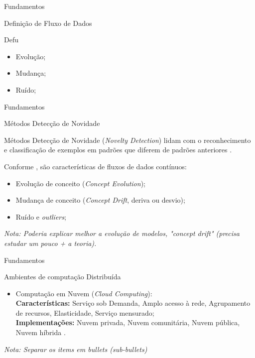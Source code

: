 \documentclass[aspectratio=43,10pt]{beamer}
\newcommand{\nota}[1]{\hspace*{-0.5cm}\textit{{\color[rgb]{1,0,0}Nota: #1}}}
\begin{document}
\begin{frame}[fragile]{Fundamentos}


\begin{block}{Definição de Fluxo de Dados}
  
  \vspace{5mm}
  Defu

  \begin{itemize}
    \item Evolução;
    \item Mudança;
    \item Ruído;
  \end{itemize}
\end{block}
\end{frame}

\newcommand{\novelty}{\emph{Novelty Detection}\xspace}
\newcommand{\nd}{ND\xspace}
\newcommand{\drift}{\emph{Concept Drift}\xspace}
\newcommand{\evolution}{\emph{Concept Evolution}\xspace}

\begin{frame}[fragile]{Fundamentos}
  \begin{alertblock}{Métodos Detecção de Novidade}
    
    \vspace{5mm}
    Métodos Detecção de Novidade (\novelty) lidam com o reconhecimento e
    classificação de exemplos em padrões que diferem de padrões anteriores
    \cite{PERNER2007,Gama2010}.
  
    Conforme , são características de fluxos de dados contínuos:
    \begin{itemize}
      \item Evolução de conceito (\evolution);
      \item Mudança de conceito (\drift, deriva ou desvio);
      \item Ruído e \emph{outliers};
    \end{itemize}
  \end{alertblock}
\nota{Poderia explicar melhor a evolução de modelos, "concept drift"
(precisa estudar um pouco + a teoria).}
\end{frame}

\begin{frame}[fragile]{Fundamentos}
\begin{alertblock}{Ambientes de computação Distribuída}
\begin{itemize}
  \item Computação em Nuvem (\emph{Cloud Computing}):
  \\ \textbf{Características:}
  Serviço sob Demanda,
  Amplo acesso à rede,
  Agrupamento de recursos,
  Elasticidade,
  Serviço mensurado;
  \\ \textbf{Implementações:}
    Nuvem privada,
    Nuvem comunitária,
    Nuvem pública,
    Nuvem híbrida
    \cite{NIST2011}.
  
\end{itemize}
\end{alertblock}
\nota{Separar os items em bullets (sub-bullets)}
\end{frame}
\end{document}

